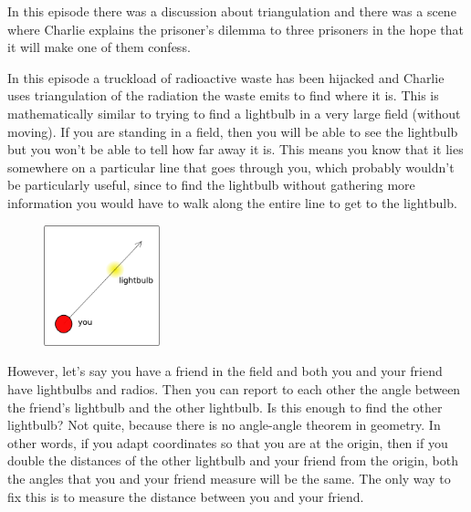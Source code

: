 \newpage
{}
{}
\setcounter{activity}{0}

In this episode there was a discussion about triangulation and there was a scene where Charlie explains the prisoner's dilemma to three prisoners in the hope that it will make one of them confess. \\




In this episode a truckload of radioactive waste has been hijacked and Charlie uses triangulation of the radiation the waste emits to find where it is. This is mathematically similar to trying to find a lightbulb in a very large field (without moving). If you are standing in a field, then you will be able to see the lightbulb but you won't be able to tell how far away it is. This means you know that it lies somewhere on a particular line that goes through you, which probably wouldn't be particularly useful, since to find the lightbulb without gathering more information you would have to walk along the entire line to get to the lightbulb.

	\begin{figure}[H]
	\centering
	\includegraphics[width=0.30\textwidth]{../sections/seasons/season1/110/images/drawing1.png} 
	\end{figure}


However, let's say you have a friend in the field and both you and your friend have lightbulbs and radios. Then you can report to each other the angle between the friend's lightbulb and the other lightbulb. Is this enough to find the other lightbulb? Not quite, because there is no angle-angle theorem in geometry. In other words, if you adapt coordinates so that you are at the origin, then if you double the distances of the other lightbulb and your friend from the origin, both the angles that you and your friend measure will be the same. The only way to fix this is to measure the distance between you and your friend.


